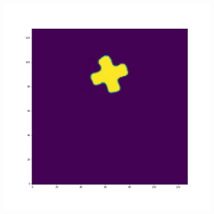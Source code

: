 \documentclass[12pt,a4paper]{article}
\begin{document}
\begin{figure}[H]
\begin{minipage}{.3\textwidth}
\end{minipage}%
\begin{minipage}{.3\textwidth}
  \centering
  \includegraphics[width=\linewidth]{Pictures/PlusRotateTestTHINC/PlusRotateTest_t20.png}
\end{minipage}
\end{figure}
\end{document}

